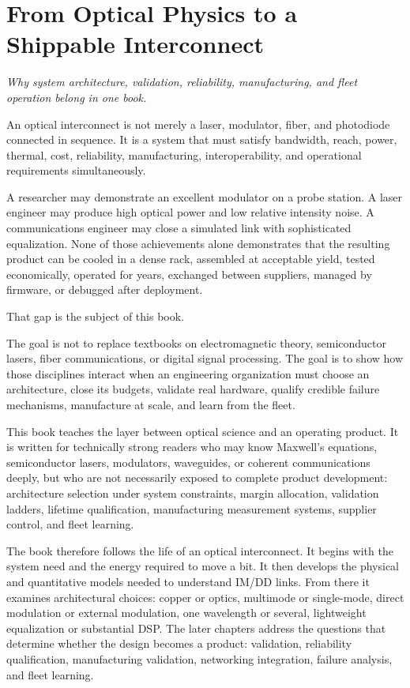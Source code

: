 \chapter{From Optical Physics to a Shippable Interconnect}
\label{ch:role}

\textit{Why system architecture, validation, reliability, manufacturing, and
fleet operation belong in one book.}

An optical interconnect is not merely a laser, modulator, fiber, and photodiode
connected in sequence. It is a system that must satisfy bandwidth, reach, power,
thermal, cost, reliability, manufacturing, interoperability, and operational
requirements simultaneously.

A researcher may demonstrate an excellent modulator on a probe station. A laser
engineer may produce high optical power and low relative intensity noise. A
communications engineer may close a simulated link with sophisticated
equalization. None of those achievements alone demonstrates that the resulting
product can be cooled in a dense rack, assembled at acceptable yield, tested
economically, operated for years, exchanged between suppliers, managed by
firmware, or debugged after deployment.

That gap is the subject of this book.

The goal is not to replace textbooks on electromagnetic theory, semiconductor
lasers, fiber communications, or digital signal processing. The goal is to show
how those disciplines interact when an engineering organization must choose an
architecture, close its budgets, validate real hardware, qualify credible
failure mechanisms, manufacture at scale, and learn from the fleet.

This book teaches the layer between optical science and an operating product.
It is written for technically strong readers who may know Maxwell's equations,
semiconductor lasers, modulators, waveguides, or coherent communications deeply,
but who are not necessarily exposed to complete product development:
architecture selection under system constraints, margin allocation, validation
ladders, lifetime qualification, manufacturing measurement systems, supplier
control, and fleet learning.

The book therefore follows the life of an optical interconnect. It begins with
the system need and the energy required to move a bit. It then develops the
physical and quantitative models needed to understand IM/DD links. From there it
examines architectural choices: copper or optics, multimode or single-mode,
direct modulation or external modulation, one wavelength or several, lightweight
equalization or substantial DSP. The later chapters address the questions that
determine whether the design becomes a product: validation, reliability
qualification, manufacturing validation, networking integration, failure
analysis, and fleet learning.


